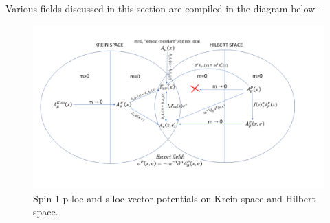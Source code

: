 \documentclass[12pt,a4paper]{article}
\numberwithin{equation}{section}
\begin{document}
Various fields discussed in this section are compiled in the diagram below - 
\begin{figure}[H]
\centering
\includegraphics[scale=0.5]{s-lokal}
\caption{Spin 1 p-loc and s-loc vector potentials on Krein space and Hilbert space.}
\end{figure}    
\end{document}
